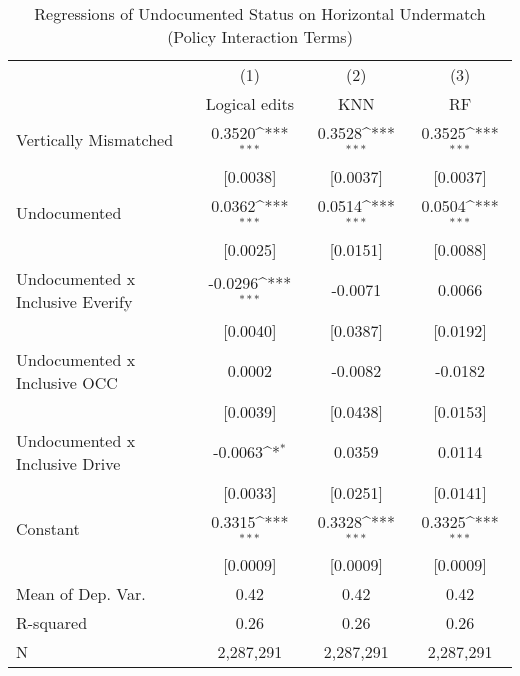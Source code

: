\begin{table}[htbp]\centering
\def\sym#1{\ifmmode^{#1}\else\(^{#1}\)\fi}
\caption{Regressions of Undocumented Status on Horizontal Undermatch (Policy Interaction Terms)}
\begin{tabular}{l*{3}{c}}
\toprule
                    &\multicolumn{1}{c}{(1)}         &\multicolumn{1}{c}{(2)}         &\multicolumn{1}{c}{(3)}         \\
                    &Logical edits         &         KNN         &          RF         \\
\midrule
Vertically Mismatched&      0.3520\sym{***}&      0.3528\sym{***}&      0.3525\sym{***}\\
                    &    [0.0038]         &    [0.0037]         &    [0.0037]         \\
\addlinespace
Undocumented        &      0.0362\sym{***}&      0.0514\sym{***}&      0.0504\sym{***}\\
                    &    [0.0025]         &    [0.0151]         &    [0.0088]         \\
\addlinespace
Undocumented x Inclusive Everify&     -0.0296\sym{***}&     -0.0071         &      0.0066         \\
                    &    [0.0040]         &    [0.0387]         &    [0.0192]         \\
\addlinespace
Undocumented x Inclusive OCC&      0.0002         &     -0.0082         &     -0.0182         \\
                    &    [0.0039]         &    [0.0438]         &    [0.0153]         \\
\addlinespace
Undocumented x Inclusive Drive&     -0.0063\sym{*}  &      0.0359         &      0.0114         \\
                    &    [0.0033]         &    [0.0251]         &    [0.0141]         \\
\addlinespace
Constant            &      0.3315\sym{***}&      0.3328\sym{***}&      0.3325\sym{***}\\
                    &    [0.0009]         &    [0.0009]         &    [0.0009]         \\
\midrule
Mean of Dep. Var.   &        0.42         &        0.42         &        0.42         \\
R-squared           &        0.26         &        0.26         &        0.26         \\
N                   &   2,287,291         &   2,287,291         &   2,287,291         \\

\end{tabular}
\end{table}
